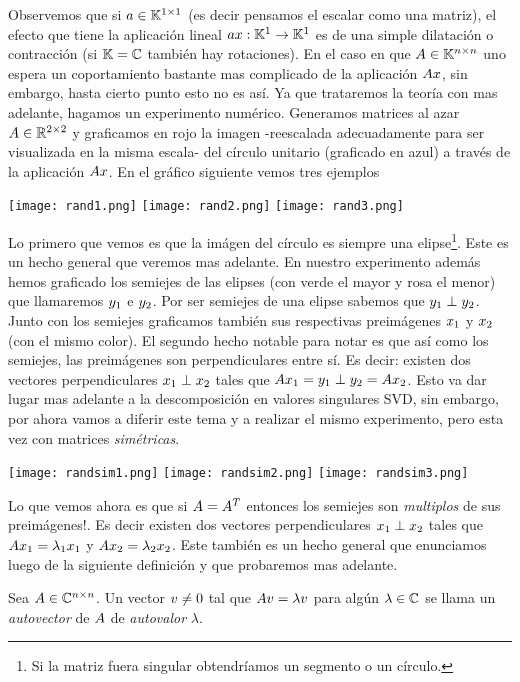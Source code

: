 Observemos que si  $\ab\in \K^{1\times 1}$ (es decir pensamos el escalar como una matriz), el efecto que tiene la aplicación lineal $\ab \xb:\K^1\to \K^1$ es de una simple dilatación o contracción (si $\mathbb K=\mathbb C$ también hay rotaciones). En el caso en que $\Ab\in \K^{n\times n}$ uno espera un coportamiento bastante mas complicado de la aplicación $\Ab\xb$, sin embargo, hasta cierto punto esto no es así.
Ya que trataremos la teoría con mas adelante, hagamos un experimento numérico. Generamos matrices al azar $\Ab\in\R^{2\times 2}$  y graficamos en rojo la imagen -reescalada adecuadamente para ser visualizada en la misma escala- del círculo unitario (graficado en azul) a través de la aplicación $\Ab\xb$. En el gráfico siguiente vemos tres ejemplos
\begin{center}
\texttt{[image: rand1.png]}
\texttt{[image: rand2.png]}
\texttt{[image: rand3.png]}
\end{center}
Lo primero que vemos es  que la imágen del círculo es siempre una elipse\footnote{Si la matriz fuera singular obtendríamos  un segmento o un círculo.}. Este es un hecho general que veremos mas adelante. En nuestro experimento además hemos graficado los semiejes de las elipses (con verde el mayor y rosa el menor) que llamaremos $\yb_1$ e $\yb_2$. Por ser semiejes de una elipse sabemos que  $\yb_1\perp \yb_2$. Junto con los semiejes graficamos también sus respectivas preimágenes $\xb_1$ y $\xb_2$ (con el mismo color). El segundo hecho notable para notar es que así como los semiejes, las preimágenes son perpendiculares entre sí. Es decir: existen dos vectores perpendiculares $\xb_1\perp \xb_2$ tales que $\Ab\xb_1=\yb_1\perp \yb_2=\Ab\xb_2$. Esto va dar lugar mas adelante a la descomposición en valores singulares SVD, sin embargo, por ahora vamos a diferir este tema y a realizar el mismo  experimento, pero esta vez con matrices \emph{simétricas}.
\begin{center}
\texttt{[image: randsim1.png]}
\texttt{[image: randsim2.png]}
\texttt{[image: randsim3.png]}
\end{center}
Lo que vemos ahora es que si $\Ab=\Ab^T$ entonces los semiejes son \emph{multiplos} de sus preimágenes!. Es decir
existen dos vectores perpendiculares $\xb_1\perp \xb_2$ tales que $\Ab\xb_1=\lambda_1\xb_1$ y $\Ab\xb_2=\lambda_2\xb_2$.
Este también es un hecho general que enunciamos luego de la siguiente definición y que probaremos mas adelante.
\tccdefi
\begin{defi}
 Sea $\Ab\in \Cnn$. Un vector $\vb\neq \cero$ tal que $\Ab\vb=\lambda\vb$ para algún $\lambda\in \mathbb C$ se llama un \emph{autovector} de $\Ab$ de \emph{autovalor}  $\lambda$.
\end{defi}
